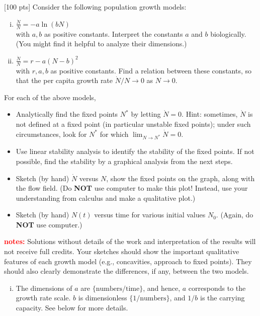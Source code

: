 \documentclass[12pt]{article}
\begin{document}


\begin{ex}
  
  [100 pts] Consider the following population growth models:
  \begin{enumerate}[(i)]\setlength{\itemsep}{0pt}
  \item $\displaystyle{\frac{\dot{N}}{N}=-a\ln(bN)}$\\
    with $a,b$ as positive constants. Interpret the constants $a$ and $b$ biologically. (You might find it helpful to analyze their dimensions.)
  \item $\displaystyle{\frac{\dot{N}}{N}=r-a(N-b)^2}$\\
    with $r,a,b$ as positive constants. Find a relation between these constants, so that the per capita growth rate $\dot{N}/N\to 0$ as $N\to 0$.
  \end{enumerate}
  For each of the above models,
  \begin{itemize}\setlength{\itemsep}{0pt}
      \item Analytically find the fixed points $N^*$ by letting $\dot{N}=0$. Hint: sometimes, $\dot{N}$ is not defined at a fixed point (in particular unstable fixed points); under such circumstances, look for $N^*$ for which $\lim_{N\to N^*}\dot{N}=0$.
      \item Use linear stability analysis to identify the stability of the fixed points. If not possible, find the stability by a graphical analysis from the next steps.
      \item Sketch (by hand) $\dot{N}$ versus $N$, show the fixed points on the graph, along with the flow field. (Do \textbf{NOT} use computer to make this plot! Instead, use your understanding from calculus and make a qualitative plot.)
      \item Sketch (by hand) $N(t)$ versus time for various initial values $N_0$. (Again, do \textbf{NOT} use computer.)
  \end{itemize}

\noindent\textbf{\textcolor{red}{notes:} }Solutions without details of the work and interpretation of the results will not receive full credits. Your sketches should show the important qualitative features of each growth model (e.g., concavities, approach to fixed points). They should also clearly demonstrate the differences, if any, between the two models.

\begin{solution}
  \begin{enumerate}[(i)]\setlength{\itemsep}{0pt}
  \item The dimensions of $a$ are $\{\mathrm{numbers}/\mathrm{time}\}$, and hence, $a$ corresponds to the growth rate scale. $b$ is dimensionless $\{1/\mathrm{numbers}\}$, and $1/b$ is the carrying capacity. See below for more details.


\end{enumerate}
\end{solution}
\end{ex}
\end{document}

